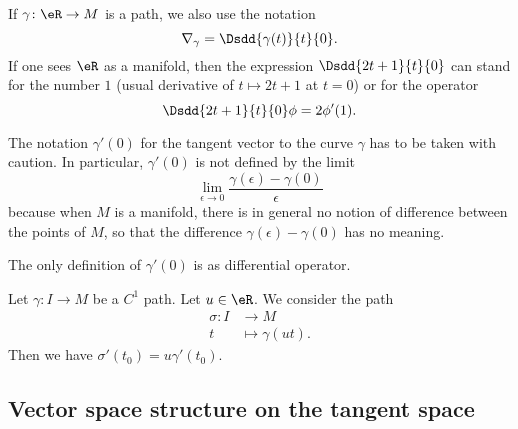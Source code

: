 If \( \gamma\colon \eR\to M\) is a path, we also use the notation
\begin{equation}        \label{EQooJQVRooLziKoH}
	\nabla_{\gamma}=\Dsdd{ \gamma(t) }{t}{0}.
\end{equation}
If one sees \( \eR\) as a manifold, then the expression \( \Dsdd{ 2t+1 }{t}{0}\) can stand for the number \( 1\) (usual derivative of \( t\mapsto 2t+1\) at \( t=0\)) or for the operator
\begin{equation}
	\Dsdd{ 2t+1 }{t}{0}\phi=2\phi'(1).
\end{equation}

\begin{remark}      \label{REMooJQFHooQuoZxt}
	The notation \( \gamma'(0)\) for the tangent vector to the curve \( \gamma\) has to be taken with caution. In particular, \( \gamma'(0)\) is not defined by the limit
	\begin{equation}        \label{EQooVMGFooFUCNEY}
		\lim_{\epsilon\to 0} \frac{ \gamma(\epsilon)-\gamma(0) }{ \epsilon }
	\end{equation}
	because when \( M\) is a manifold, there is in general no notion of difference between the points of \( M\), so that the difference \( \gamma(\epsilon)-\gamma(0)\) has no meaning.

	The only definition of \( \gamma'(0)\) is as differential operator.
\end{remark}

\begin{lemma}        \label{LEMooMHSQooQyTZCg}
	Let \( \gamma\colon I\to M\) be a \( C^1\) path. Let \( u\in \eR\). We consider the path
	\begin{equation}
		\begin{aligned}
			\sigma\colon I & \to M               \\
			t              & \mapsto \gamma(ut).
		\end{aligned}
	\end{equation}
	Then we have \( \sigma'(t_0)=u\gamma'(t_0)\).
\end{lemma}


\subsection{Vector space structure on the tangent space}

